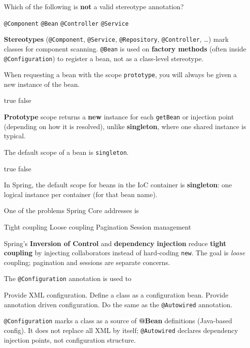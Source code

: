 \question[4]
Which of the following is \textbf{not} a valid stereotype annotation?
\begin{choices}
  \choice \texttt{@Component}
  \CorrectChoice \texttt{@Bean}
  \choice \texttt{@Controller}
  \choice \texttt{@Service}
\end{choices}
\begin{solution}
  \textbf{Stereotypes} (\texttt{@Component}, \texttt{@Service}, \texttt{@Repository}, \texttt{@Controller}, \ldots) mark classes for component scanning. \texttt{@Bean} is used on \textbf{factory methods} (often inside \texttt{@Configuration}) to register a bean, not as a class-level stereotype.
\end{solution}

\question[4]
When requesting a bean with the scope \texttt{prototype}, you will always be given a new instance of the bean.
\begin{choices}
  \CorrectChoice true
  \choice false
\end{choices}
\begin{solution}
  \textbf{Prototype} scope returns a \textbf{new} instance for each \texttt{getBean} or injection point (depending on how it is resolved), unlike \textbf{singleton}, where one shared instance is typical.
\end{solution}

\question[4]
The default scope of a bean is \texttt{singleton}.
\begin{choices}
  \CorrectChoice true
  \choice false
\end{choices}
\begin{solution}
  In Spring, the default scope for beans in the IoC container is \textbf{singleton}: one logical instance per container (for that bean name).
\end{solution}

\question[4]
One of the problems Spring Core addresses is
\begin{choices}
  \CorrectChoice Tight coupling
  \choice Loose coupling
  \choice Pagination
  \choice Session management
\end{choices}
\begin{solution}
  Spring's \textbf{Inversion of Control} and \textbf{dependency injection} reduce \textbf{tight coupling} by injecting collaborators instead of hard-coding \texttt{new}. The goal is \emph{loose} coupling; pagination and sessions are separate concerns.
\end{solution}

\question[4]
The \texttt{@Configuration} annotation is used to
\begin{choices}
  \choice Provide XML configuration.
  \CorrectChoice Define a class as a configuration bean.
  \choice Provide annotation driven configuration.
  \choice Do the same as the \texttt{@Autowired} annotation.
\end{choices}
\begin{solution}
  \texttt{@Configuration} marks a class as a source of \textbf{@Bean} definitions (Java-based config). It does not replace all XML by itself; \texttt{@Autowired} declares dependency injection points, not configuration structure.
\end{solution}


